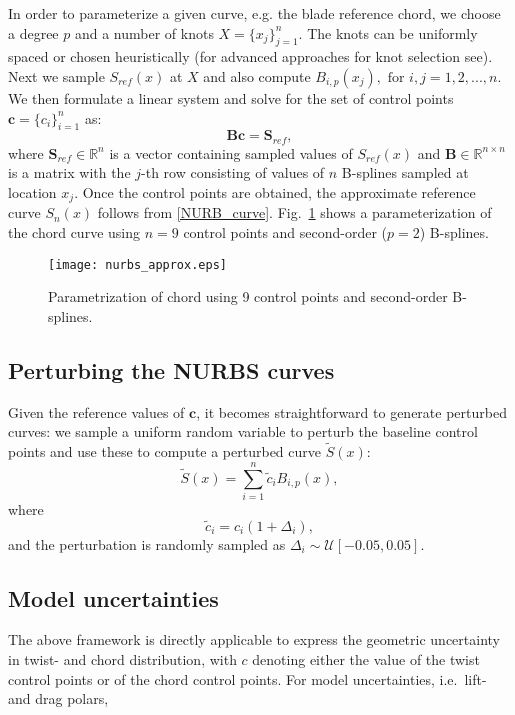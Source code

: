 In order to parameterize a given curve, e.g. the blade reference chord, we choose a degree $p$ and a number of knots $X =\{x_j\}_{j=1}^n$. The knots can be uniformly spaced or chosen heuristically (for advanced approaches for knot selection see\cite{LI2005791,razdan1999knot}). Next we sample $S_{ref}(x)$ at $X$ and also compute $B_{i,p}(x_j), \text{ for }i, j = 1,2, ..., n$. We then formulate a linear system and solve for the set of control points $\mathbf{c}=\{c_i\}_{i=1}^n$ as:
\begin{equation}\label{nurbs_inversion}
\mathbf{B}\mathbf{c} = \mathbf{S}_{ref},
\end{equation}
where $\mathbf{S}_{ref}\in\mathbb{R}^{n}$ is a vector containing sampled values of $S_{ref}(x)$ and $\mathbf{B}\in \mathbb{R}^{n\times n}$ is a matrix with the $j$-th row consisting of values of $n$ B-splines sampled at location $x_j$. Once the control points are obtained, the approximate reference curve $S_n(x)$ follows from \eqref{NURB_curve}. Fig.~\ref{nurbs_approx} shows a parameterization of the chord curve using $n=9$ control points and second-order ($p=2$) B-splines.
\begin{figure}[h!]
\centering
\texttt{[image: nurbs\_approx.eps]}
\caption{Parametrization of chord using 9 control points and second-order B-splines.}
\label{nurbs_approx}
\end{figure}

\subsection{Perturbing the NURBS curves}
Given the reference values of $\mathbf{c}$, it becomes straightforward to generate perturbed curves: we sample a uniform random variable to perturb the baseline control points and use these to compute a perturbed curve $\tilde{S}(x)$:
\begin{equation}
\tilde{S} (x) = \sum_{i=1}^{n} \tilde{c}_{i} B_{i,p}(x),
\end{equation}
where
\begin{equation}\label{eqn:perturb_c}
\tilde{c}_{i} = c_{i} (1 + \Delta_{i}),
\end{equation}
and the perturbation is randomly sampled as $\Delta_{i} \sim \mathcal{U}[-0.05,0.05]$. 


\subsection{Model uncertainties}
The above framework is directly applicable to express the geometric uncertainty in twist- and chord distribution, with $c$ denoting either the value of the twist control points or of the chord control points. For model uncertainties, i.e.\ lift- and drag polars, 

